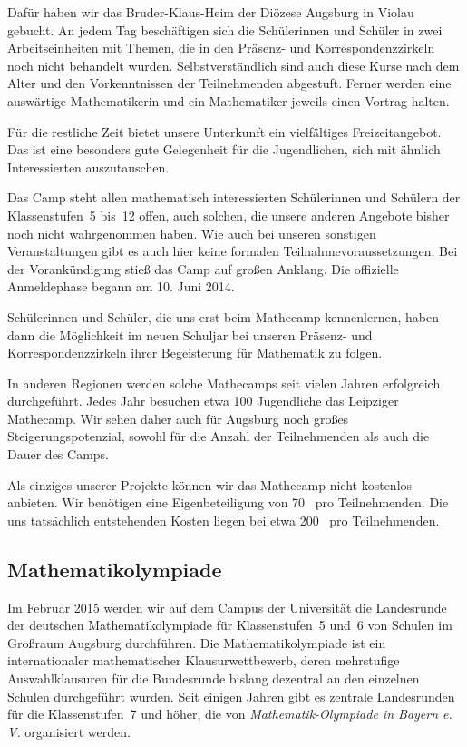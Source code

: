 \documentclass[12pt]{zettel}
\begin{document}
Dafür haben wir das Bruder-Klaus-Heim der Diözese Augsburg in Violau
gebucht. An jedem Tag beschäftigen sich die Schülerinnen und Schüler in zwei
Arbeitseinheiten mit Themen, die in den Präsenz- und Korrespondenzzirkeln noch
nicht behandelt wurden. Selbstverständlich sind auch diese Kurse nach dem Alter
und den Vorkenntnissen der Teilnehmenden abgestuft. Ferner
werden eine auswärtige Mathematikerin und ein Mathematiker jeweils einen
Vortrag halten.

Für die restliche Zeit bietet unsere Unterkunft ein vielfältiges
Freizeitangebot. Das ist eine besonders gute Gelegenheit für die Jugendlichen,
sich mit ähnlich Interessierten auszutauschen.

Das Camp steht allen mathematisch interessierten Schülerinnen und Schülern der
Klassenstufen~5 bis~12 offen, auch solchen, die unsere anderen Angebote bisher
noch nicht wahrgenommen haben. Wie auch bei unseren sonstigen Veranstaltungen gibt es auch hier keine formalen Teilnahmevoraussetzungen. Bei der Vorankündigung stieß das Camp auf großen
Anklang. Die offizielle Anmeldephase begann am 10. Juni 2014.

Schülerinnen und Schüler, die uns erst beim Mathecamp kennenlernen, haben dann die Möglichkeit im neuen Schuljar bei unseren Präsenz- und Korrespondenzzirkeln ihrer Begeisterung für Mathematik zu folgen.

In anderen Regionen werden solche Mathecamps seit vielen Jahren erfolgreich durchgeführt. Jedes Jahr besuchen etwa 100 Jugendliche das Leipziger Mathecamp. Wir sehen daher auch für Augsburg noch großes Steigerungspotenzial, sowohl für die Anzahl der Teilnehmenden als auch die Dauer des Camps.

Als einziges unserer Projekte können wir das Mathecamp nicht kostenlos
anbieten. Wir benötigen eine Eigenbeteiligung von 70~\texteuro{} pro
Teilnehmenden. Die uns tatsächlich entstehenden Kosten liegen bei etwa
200~\texteuro{} pro Teilnehmenden.

\subsection{Mathematikolympiade}

Im Februar 2015 werden wir auf dem Campus der Universität die Landesrunde der deutschen
Mathematikolympiade für Klassenstufen~5 und~6 von Schulen im Großraum
Augsburg durchführen. Die Mathematikolympiade ist ein internationaler mathematischer
Klausurwettbewerb, deren mehrstufige Auswahlklausuren für die Bundesrunde
bislang dezentral an den einzelnen Schulen durchgeführt wurden. Seit einigen
Jahren gibt es zentrale Landesrunden für die Klassenstufen~7 und höher, die von
\emph{Mathematik-Olympiade in Bayern e.\,V.} organisiert werden.
\end{document}
